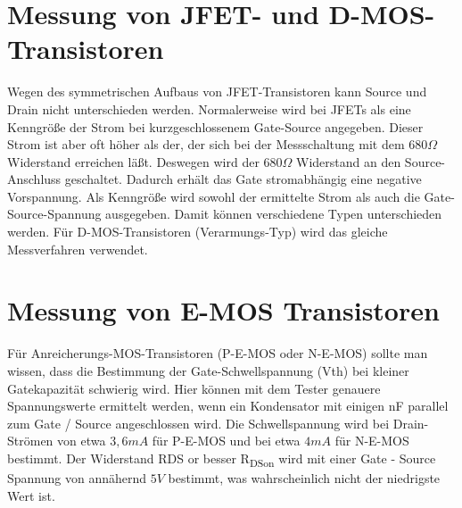 \section{Messung von JFET- und D-MOS-Transistoren}
Wegen des symmetrischen Aufbaus von JFET-Transistoren kann Source und Drain nicht unterschieden werden.
Normalerweise wird bei JFETs als eine Kenngröße der Strom bei kurzgeschlossenem Gate-Source angegeben.
Dieser Strom ist aber oft höher als der, der sich bei der Messschaltung mit dem \(680\Omega\) Widerstand erreichen läßt.
Deswegen wird der \(680\Omega\) Widerstand an den Source-Anschluss geschaltet. Dadurch erhält das Gate
stromabhängig eine negative Vorspannung. Als Kenngröße wird sowohl der ermittelte Strom als auch die
Gate-Source-Spannung ausgegeben. 
Damit können verschiedene Typen unterschieden werden.
Für D-MOS-Transistoren (Verarmungs-Typ) wird das gleiche Messverfahren verwendet.

\section{Messung von E-MOS Transistoren}
Für Anreicherungs-MOS-Transistoren (P-E-MOS oder N-E-MOS) sollte man wissen, dass die Bestimmung der Gate-Schwellspannung (Vth)
bei kleiner Gatekapazität schwierig wird. Hier können mit dem Tester genauere Spannungswerte ermittelt werden, wenn ein
Kondensator mit einigen nF parallel zum Gate / Source angeschlossen wird.
Die Schwellspannung wird bei Drain-Strömen von etwa \(3,6mA\) für P-E-MOS und bei etwa \(4mA\) für N-E-MOS bestimmt.
Der Widerstand RDS or besser R\textsubscript{DSon} wird mit einer Gate - Source Spannung von annähernd \(5V\) bestimmt,
 was wahrscheinlich nicht der niedrigste Wert ist.

